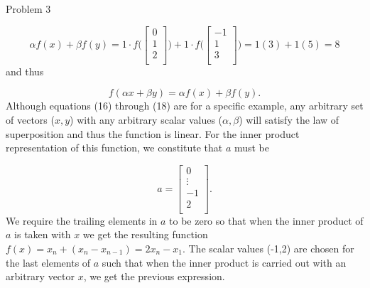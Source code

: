 \begin{problem}{Problem 3}
\begin{highlight}
        \begin{equation}
            \alpha f(x) + \beta f(y) = 1 \cdot f \Bigg(
                \begin{bmatrix}
                    0 \\
                    1 \\
                    2 \\
                \end{bmatrix}
                \Bigg) + 1 \cdot f \Bigg(
                \begin{bmatrix}
                    -1 \\
                    1 \\
                    3 \\
                \end{bmatrix}
                \Bigg) = 1(3) + 1(5) = 8
        \end{equation}
        and thus

        \begin{equation}
            f(\alpha x + \beta y) = \alpha f(x) + \beta f(y).
        \end{equation}
        Although equations (16) through (18) are for a specific example, any arbitrary set of vectors ($x,y$) with any arbitrary scalar values ($\alpha,\beta$) will satisfy the law of superposition
        and thus the function is linear. For the inner product representation of this function, we constitute that $a$ must be

        \begin{equation}
            a = 
            \begin{bmatrix}
                0 \\
                \vdots \\
                -1 \\
                2 \\
            \end{bmatrix}.
        \end{equation}
        We require the trailing elements in $a$ to be zero so that when the inner product of $a$ is taken with $x$ we get the resulting function $f(x) = x_{n} + (x_{n} - x_{n-1}) = 2x_{n} - x_{1}$.
        The scalar values (-1,2) are chosen for the last elements of $a$ such that when the inner product is carried out with an arbitrary vector $x$, we get the previous expression.
    \end{highlight}
\end{problem}

